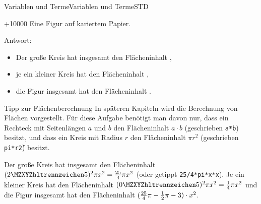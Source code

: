 \begin{MXContent}{Variablen und Terme}{Variablen und Terme}{STD}
\begin{MExercise}
\begin{center}
\par\ifttm\else\penalty+10000\fi
Eine Figur auf kariertem Papier.
\end{center}

Antwort:
\begin{itemize}
\item{Der große Kreis hat insgesamt den Flächeninhalt ,}
\item{je ein kleiner Kreis hat den Flächeninhalt ,}
\item{die Figur insgesamt hat den Flächeninhalt .}
\end{itemize}

\begin{MHint}{Tipp zur Flächenberechnung}
In späteren Kapiteln wird die Berechnung von Flächen vorgestellt. Für diese Aufgabe benötigt man davon nur, dass 
ein Rechteck mit Seitenlängen $a$ und $b$ den Flächeninhalt $a\cdot b$ (geschrieben \texttt{a*b}) besitzt,
und dass ein Kreis mit Radius $r$ den Flächeninhalt $\pi r^2$ (geschrieben \texttt{pi*r\^2}) besitzt.
\end{MHint}

\begin{MHint}{\iSolution}
Der große Kreis hat insgesamt den Flächeninhalt $(\MZahl{2}{5})^2\pi x^2=\Mtfrac{25}{4}\pi x^2$ (oder getippt \texttt{25/4*pi*x*x}). %
Je ein kleiner Kreis hat den Flächeninhalt $(\MZahl{0}{5})^2\pi x^2=\Mtfrac{1}{4}\pi x^2$ und
die Figur insgesamt hat den Flächeninhalt $(\tfrac{25}{4}\pi-\tfrac{1}{2}\pi-3)\cdot x^2$. %
\end{MHint}
\end{MExercise}

\end{MXContent}

